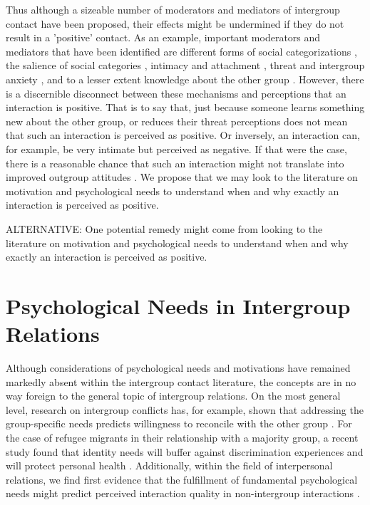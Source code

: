\documentclass[man, 12pt, a4paper]{apa7}
\theoremstyle{break}
\theoremstyle{plain}
\begin{document}
Thus although a sizeable number of moderators and mediators of intergroup contact have been proposed, their effects might be undermined if they do not result in a 'positive' contact. As an example, important moderators and mediators that have been identified are different forms of social categorizations \citep[][]{Pettigrew1998}, the salience of social categories \citep[][]{Brown2005}, intimacy \citep[e.g.,][]{Marinucci2021} and attachment \citep[e.g.,][]{Tropp2021}, threat and intergroup anxiety \citep[e.g.,][]{Stephan2008, Paolini2004}, and to a lesser extent knowledge about the other group \citep[][]{Pettigrew2008c}. However, there is a discernible disconnect between these mechanisms and perceptions that an interaction is positive. That is to say that, just because someone learns something new about the other group, or reduces their threat perceptions does not mean that such an interaction is perceived as positive. Or inversely, an interaction can, for example, be very intimate but perceived as negative. If that were the case, there is a reasonable chance that such an interaction might not translate into improved outgroup attitudes \citep[e.g.,][]{Barlow2012}. We propose that we may look to the literature on motivation and psychological needs to understand when and why exactly an interaction is perceived as positive.


ALTERNATIVE: One potential remedy might come from looking to the literature on motivation and psychological needs to understand when and why exactly an interaction is perceived as positive. 

\section{Psychological Needs in Intergroup Relations}
Although considerations of psychological needs and motivations have remained markedly absent within the intergroup contact literature, the concepts are in no way foreign to the general topic of intergroup relations. On the most general level, research on intergroup conflicts has, for example, shown that addressing the group-specific needs predicts willingness to reconcile with the other group \citep[][]{Shnabel2008}. For the case of refugee migrants in their relationship with a majority group, a recent study found that identity needs will buffer against discrimination experiences and will protect personal health \citep[][]{Celebi2017}. Additionally, within the field of interpersonal relations, we find first evidence that the fulfillment of fundamental psychological needs might predict perceived interaction quality in non-intergroup interactions \citep[][]{Downie2008}. 
\end{document}
